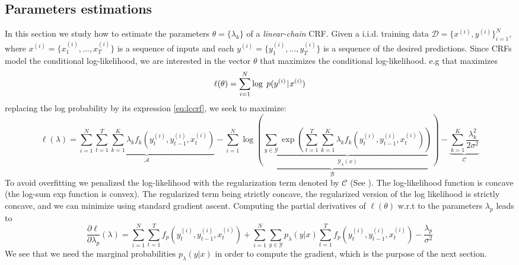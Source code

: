 \documentclass[a4paper, 11pt]{article}
\newcommand{\pcond}[2]{p(#1 \hspace{-.2em}\mid\hspace{-.2em} #2)}
\begin{document}
\subsection{Parameters estimations}

In this section we study how to estimate the parameters
$\theta = \{\lambda_k\}$ of a \emph{linear-chain} CRF. Given a
i.i.d. training data $\mathcal{D} = \{x^{(i)}, y^{(i)}\}_{i=1}^N$,
where $x^{(i)} = \{x_1^{(i)}, \hdots, x_T^{(i)}\}$ is a sequence of
inputs and each $y^{(i)} = \{y_1^{(i)}, \hdots, y_T^{(i)}\}$ is a
sequence of the desired predictions.  Since CRFs model the conditional
log-likelihood, we are interested in the vector $\theta$ that
maximizes the conditional log-likelihood. e.g that maximizes
\begin{equation}
    \ell(\theta) = \sum\limits_{i=1}^N \log \; \pcond{y^{(i)}}{x^{(i)}}
\end{equation}
replacing the log probability by its expression \eqref{eq:lccrf}, we seek to maximize:
\begin{equation*}
  \ell(\lambda) = \underbrace{\sum\limits_{i=1}^N \sum\limits_{t=1}^T \sum\limits_{k=1}^K \lambda_k f_k(y_t^{(i)}, y_{t-1}^{(i)}, x_t^{(i)})}_{\mathcal{A}}
  - \underbrace{\sum\limits_{i=1}^N \log\left(\underbrace{\sum\limits_{y \in \mathcal{Y}} \exp\left(\sum\limits_{t=1}^T \sum\limits_{k=1}^K \lambda_k f_k(y_t^{(i)}, {y}_{t-1}^{(i)},  x_t^{(i)})\right)}_{\mathcal{Y}_{\lambda}(x)}\right)}_{\mathcal{B}}
  - \underbrace{\sum\limits_{k=1}^K \dfrac{\lambda_k^2}{2 \sigma^2}}_{\mathcal{C}}
\end{equation*}
To avoid overfitting we penalized the log-likelihood with the
regularization term denoted by $\mathcal{C}$ (See
\autocite{chen2000}).
The log-likelihood function is concave (the log-sum exp function is
convex). The regularized term being strictly concave, the regularized
version of the log likelihood is strictly concave, and we can minimize
using standard gradient ascent. Computing the partial derivatives of
$\ell(\theta)$ w.r.t to the parameters $\lambda_p$ leads to
\begin{equation}
  \frac{\partial \ell}{\partial \lambda_p}(\lambda) =
  \sum\limits_{i=1}^N \sum\limits_{t=1}^T f_p(y_t^{(i)}, {y}_{t-1}^{(i)},  x_t^{(i)}) +
  \sum\limits_{i=1}^N \sum\limits_{y \in \mathcal{Y}} p_{\lambda}(y|x) \sum\limits_{t=1}^T f_p(y_t^{(i)}, {y}_{t-1}^{(i)},  x_t^{(i)}) -
  \frac{\lambda_p}{\sigma^2}
\end{equation}
We see that we need the marginal probabilities $p_\lambda(y | x)$ in
order to compute the gradient, which is the purpose of the next
section.
\end{document}
